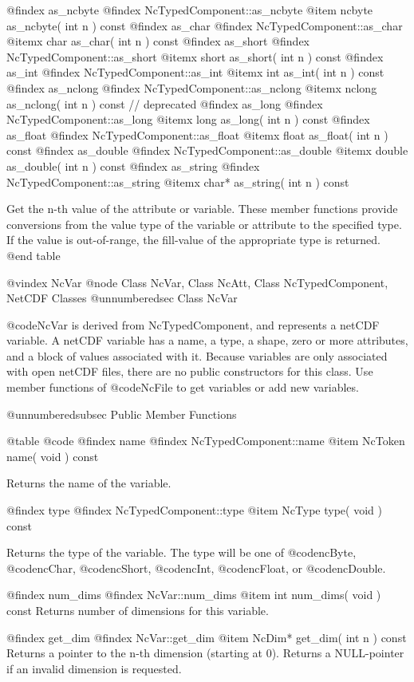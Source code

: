 @findex as_ncbyte
@findex NcTypedComponent::as_ncbyte
@item ncbyte as_ncbyte( int n ) const
@findex as_char
@findex NcTypedComponent::as_char
@itemx char as_char( int n ) const
@findex as_short
@findex NcTypedComponent::as_short
@itemx short as_short( int n ) const
@findex as_int
@findex NcTypedComponent::as_int
@itemx int as_int( int n ) const
@findex as_nclong
@findex NcTypedComponent::as_nclong
@itemx nclong as_nclong( int n ) const // deprecated
@findex as_long
@findex NcTypedComponent::as_long
@itemx long as_long( int n ) const
@findex as_float
@findex NcTypedComponent::as_float
@itemx float as_float( int n ) const
@findex as_double
@findex NcTypedComponent::as_double
@itemx double as_double( int n ) const
@findex as_string
@findex NcTypedComponent::as_string
@itemx char* as_string( int n ) const

Get the n-th value of the attribute or variable.  These member functions
provide conversions from the value type of the variable or attribute to
the specified type.  If the value is out-of-range, the
fill-value of the appropriate type is returned.
@end table


@vindex NcVar
@node Class NcVar, Class NcAtt, Class NcTypedComponent, NetCDF Classes
@unnumberedsec  Class NcVar

@code{NcVar} is derived from NcTypedComponent, and represents a netCDF
variable.  A netCDF variable has a name, a type, a shape, zero or more
attributes, and a block of values associated with it.  Because variables
are only associated with open netCDF files, there are no public
constructors for this class.  Use member functions of @code{NcFile} to
get variables or add new variables.

@unnumberedsubsec Public Member Functions

@table @code
@findex name
@findex NcTypedComponent::name
@item NcToken name( void ) const

Returns the name of the variable.

@findex type
@findex NcTypedComponent::type
@item NcType type( void ) const

Returns the type of the variable.  The type will be one of
@code{ncByte}, @code{ncChar}, @code{ncShort}, @code{ncInt},
@code{ncFloat}, or @code{ncDouble}.

@findex num_dims
@findex NcVar::num_dims
@item int num_dims( void ) const
Returns number of dimensions for this variable.

@findex get_dim
@findex NcVar::get_dim
@item NcDim* get_dim( int n ) const
Returns a pointer to the n-th dimension (starting at 0).  Returns a
NULL-pointer if an invalid dimension is requested.

